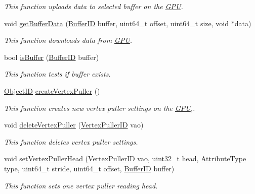 \begin{DoxyCompactItemize}
\begin{DoxyCompactList}\small\item\em This function uploads data to selected buffer on the \hyperlink{classGPU}{G\+PU}. \end{DoxyCompactList}\item 
void \hyperlink{group__buffer__tasks_ga7b89dbe4afbfec3725c64000b37445af}{get\+Buffer\+Data} (\hyperlink{fwd_8hpp_a5114031b77b80ad895eff688720b7f93}{Buffer\+ID} buffer, uint64\+\_\+t offset, uint64\+\_\+t size, void $\ast$data)
\begin{DoxyCompactList}\small\item\em This function downloads data from \hyperlink{classGPU}{G\+PU}. \end{DoxyCompactList}\item 
bool \hyperlink{group__buffer__tasks_gae725a1955d617a7e655ab751c6e05e97}{is\+Buffer} (\hyperlink{fwd_8hpp_a5114031b77b80ad895eff688720b7f93}{Buffer\+ID} buffer)
\begin{DoxyCompactList}\small\item\em This function tests if buffer exists. \end{DoxyCompactList}\item 
\hyperlink{fwd_8hpp_af56aa505d50bcd62e9e9c5a72564af4d}{Object\+ID} \hyperlink{group__vertexpuller__tasks_gaabe965c10fea7cd8f8af3aa528915c92}{create\+Vertex\+Puller} ()
\begin{DoxyCompactList}\small\item\em This function creates new vertex puller settings on the \hyperlink{classGPU}{G\+PU},. \end{DoxyCompactList}\item 
void \hyperlink{group__vertexpuller__tasks_gadf91a9fec77d8d23f093458b36a733fc}{delete\+Vertex\+Puller} (\hyperlink{fwd_8hpp_af6f78f73099477c9ce5537d657597486}{Vertex\+Puller\+ID} vao)
\begin{DoxyCompactList}\small\item\em This function deletes vertex puller settings. \end{DoxyCompactList}\item 
void \hyperlink{group__vertexpuller__tasks_gae9ffbcfa3b43ac9b3ea53e5bc44f83cc}{set\+Vertex\+Puller\+Head} (\hyperlink{fwd_8hpp_af6f78f73099477c9ce5537d657597486}{Vertex\+Puller\+ID} vao, uint32\+\_\+t head, \hyperlink{fwd_8hpp_a349a9cde14be8097df865ba0469c0ab2}{Attribute\+Type} type, uint64\+\_\+t stride, uint64\+\_\+t offset, \hyperlink{fwd_8hpp_a5114031b77b80ad895eff688720b7f93}{Buffer\+ID} buffer)
\begin{DoxyCompactList}\small\item\em This function sets one vertex puller reading head. \end{DoxyCompactList}\item 

\end{DoxyCompactItemize}
